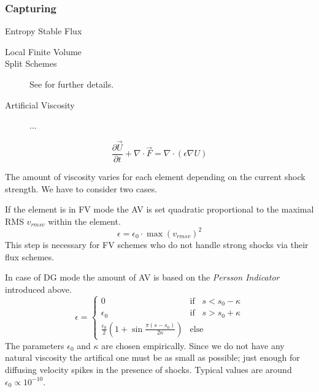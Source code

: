 \subsubsection{Capturing}



\begin{description}
    \item[Entropy Stable Flux] \cite{derigs2016}
    \item[Local Finite Volume] 
    \item[Split Schemes] See \cite{gassner2016} for further details.
    \item[Artificial Viscosity] ...
\end{description}

\begin{equation}
\label{eq:persson-indicator-gov-equ}
    \frac{\partial\vec{U}}{\partial t} + \nabla \cdot \vec{F} = \nabla \cdot (\epsilon \nabla U)
\end{equation}

The amount of viscosity varies for each element depending on the current shock
strength. We have to consider two cases.

If the element is in FV mode the AV is set quadratic proportional to the
maximal RMS $v_{rmsv}$ within the element.
\begin{equation}
    \epsilon = \epsilon_0 \cdot \max(v_{rmsv})^2    
\end{equation}
This step is necessary for FV schemes who do not handle strong shocks via their
flux schemes.

In case of DG mode the amount of AV is based on the \emph{Persson Indicator}
introduced above.
\begin{equation}
    \epsilon = \begin{cases}
        0 & \text{if}\;\;\; s < s_0 - \kappa \\
        \epsilon_0 & \text{if}\;\;\; s > s_0 + \kappa \\
        \frac{\epsilon_0}{2} \left ( 1 + \sin\frac{\pi(s-s_0)}{2\kappa} \right ) & \text{else}
    \end{cases}
\end{equation}
The parameters $\epsilon_0$ and $\kappa$ are chosen empirically.  Since we do
not have any natural viscosity the artifical one must be as small as possible;
just enough for diffusing velocity spikes in the presence of shocks. Typical
values are around $\epsilon_0 \propto 10^{-10}$.
